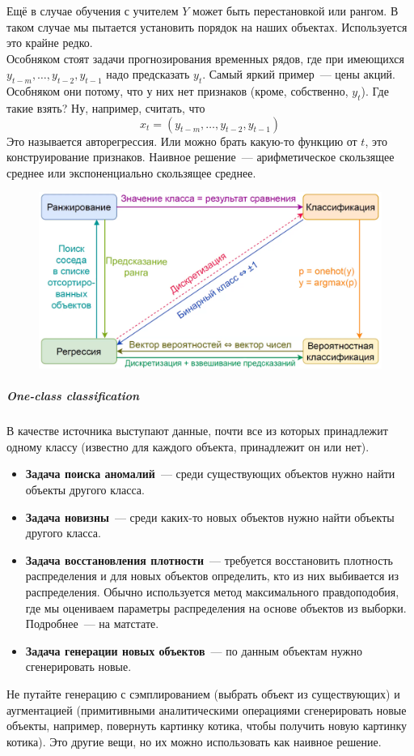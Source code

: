 \documentclass{article}
\begin{document}
    Ещё в случае обучения с учителем $Y$ может быть перестановкой или рангом. В таком случае мы пытается установить порядок на наших объектах. Используется это крайне редко.\\
    Особняком стоят задачи прогнозирования временных рядов, где при имеющихся $y_{t-m},\ldots,y_{t-2},y_{t-1}$ надо предсказать $y_t$. Самый яркий пример~--- цены акций. Особняком они потому, что у них нет признаков (кроме, собственно, $y_t$). Где такие взять? Ну, например, считать, что
    \[
    x_t=(y_{t-m},\ldots,y_{t-2},y_{t-1})
    \]
    Это называется авторегрессия. Или можно брать какую-то функцию от $t$, это конструирование признаков. Наивное решение~--- арифметическое скользящее среднее или экспоненциально скользящее среднее.
    \begin{figure}[H]
        \includegraphics[width=0.7\linewidth]{Images/Supervised-learning-problem-convertions}
    \end{figure}\noindent
    \subparagraph{One-class classification}
    В качестве источника выступают данные, почти все из которых принадлежит одному классу (известно для каждого объекта, принадлежит он или нет).
    \begin{itemize}
        \item \textbf{Задача поиска аномалий}~--- среди существующих объектов нужно найти объекты другого класса.
        \item \textbf{Задача новизны}~--- среди каких-то новых объектов нужно найти объекты другого класса.
        \item \textbf{Задача восстановления плотности}~--- требуется восстановить плотность распределения и для новых объектов определить, кто из них выбивается из распределения. Обычно используется метод максимального правдоподобия, где мы оцениваем параметры распределения на основе объектов из выборки. Подробнее~--- на матстате.
        \item \textbf{Задача генерации новых объектов}~--- по данным объектам нужно сгенерировать новые.
    \end{itemize}
    Не путайте генерацию с сэмплированием (выбрать объект из существующих) и аугментацией (примитивными аналитическими операциями сгенерировать новые объекты, например, повернуть картинку котика, чтобы получить новую картинку котика). Это другие вещи, но их можно использовать как наивное решение.\\
\end{document}

